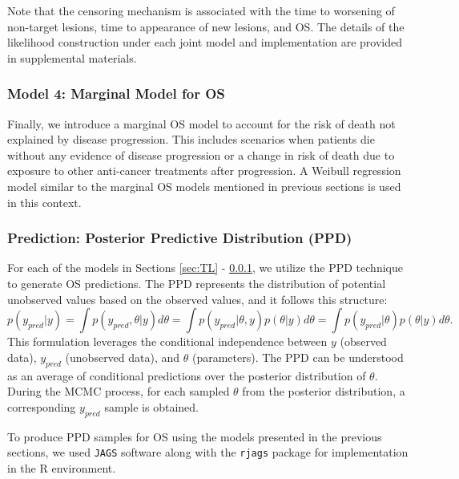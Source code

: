\documentclass[aoas]{imsart}
\theoremstyle{plain}
\theoremstyle{remark}
\begin{document}
Note that the censoring mechanism is associated with the time to worsening of non-target lesions, time to appearance of new lesions, and OS. The details of the likelihood construction under each joint model and implementation are provided in supplemental materials. 

\subsubsection{Model 4: Marginal Model for OS}\label{sec:marginal}

Finally, we introduce a marginal OS model to account for the risk of death not explained by disease progression. This includes scenarios when patients die without any evidence of disease progression or a change in risk of death due to exposure to other anti-cancer treatments after progression. A Weibull regression model similar to the marginal OS models mentioned in previous sections is used in this context.

\subsubsection{Prediction: Posterior Predictive Distribution (PPD)} \label{sec:PPD}
For each of the models in Sections \ref{sec:TL} - \ref{sec:marginal}, we utilize the PPD technique \citep{gelman2014bayesian} to generate OS predictions. The PPD represents the distribution of potential unobserved values based on the observed values, and it follows this structure:
$$p(y_{pred}|y) = \int{p(y_{pred},\theta|y)d\theta} = \int{p(y_{pred}|\theta,y)p(\theta|y)d\theta} = \int{p(y_{pred}|\theta)p(\theta|y)d\theta}.$$
This formulation leverages the conditional independence between $y$ (observed data), $y_{pred}$ (unobserved data), and $\theta$ (parameters). The PPD can be understood as an average of conditional predictions over the posterior distribution of $\theta$. During the MCMC process, for each sampled $\theta$ from the posterior distribution, a corresponding $y_{pred}$ sample is obtained. 

To produce PPD samples for OS using the models presented in the previous sections, we used \texttt{JAGS} software \citep{plummer2017jags} along with the \texttt{rjags} package for implementation in the R environment.
\end{document}
